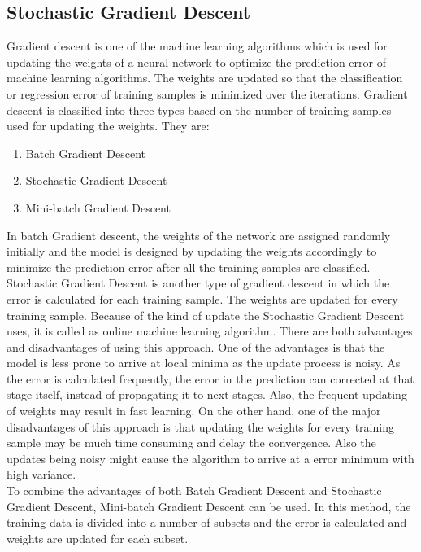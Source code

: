 \documentclass[sigconf]{acmart}
\begin{document}
\subsection{Stochastic Gradient Descent}
Gradient descent is one of the machine learning algorithms which is used for updating the weights of a neural network to optimize the prediction error of machine learning algorithms\cite{Brownlee2017}. The weights are updated so that the classification or regression error of training samples is minimized over the iterations. Gradient descent is classified into three types based on the number of training samples used for updating the weights. They are:\\
\begin{enumerate}
    \item Batch Gradient Descent
    \item Stochastic Gradient Descent
    \item Mini-batch Gradient Descent
\end{enumerate}
In batch Gradient descent, the weights of the network are assigned randomly initially and the model is designed by updating the weights accordingly to minimize the prediction error after all the training samples are classified. \cite{Brownlee2017}\\
Stochastic Gradient Descent is another type of gradient descent in which the error is calculated for each training sample. The weights are updated for every training sample. Because of the kind of update the Stochastic Gradient Descent uses, it is called as online machine learning algorithm. There are both advantages and disadvantages of using this approach. One of the advantages is that the model is less prone to arrive at local minima as the update process is noisy\cite{Brownlee2017}. As the error is calculated frequently, the error in the prediction can corrected at that stage itself, instead of propagating it to next stages. Also, the frequent updating of weights may result in fast learning. On the other hand, one of the major disadvantages of this approach is that updating the weights for every training sample may be much time consuming and delay the convergence. Also the updates being noisy might cause the algorithm to arrive at a error minimum with high variance\cite{Brownlee2017}.\\
To combine the advantages of both Batch Gradient Descent and Stochastic Gradient Descent, Mini-batch Gradient Descent can be used\cite{Brownlee2017}. In this method, the training data is divided into a number of subsets and the error is calculated and weights are updated for each subset. 
\end{document}
